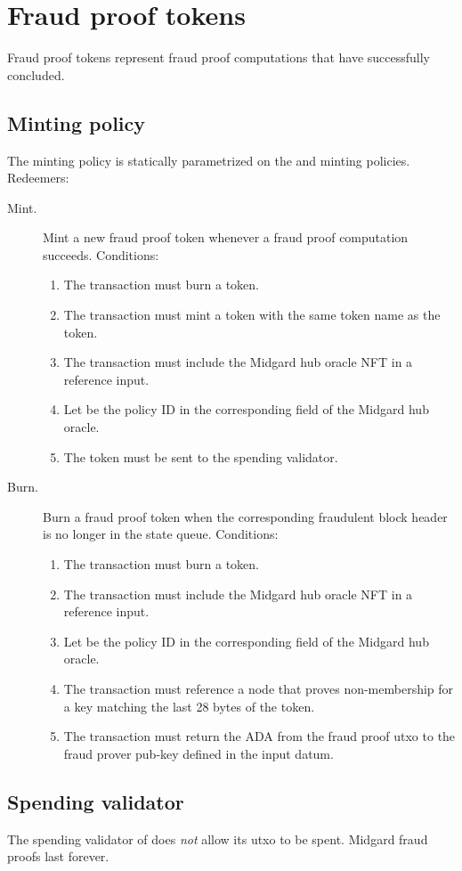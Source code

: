 \documentclass[../midgard.tex]{subfiles}
\begin{document}
\section{Fraud proof tokens}
\label{h:fraud-proof-tokens}

Fraud proof tokens represent fraud proof computations that have successfully concluded.

\subsection{Minting policy}
\label{h:fraud-proof-tokens-minting-policy}

The  minting policy is statically parametrized on the  and  minting policies.
Redeemers:

\begin{description}
    \item[Mint.] Mint a new fraud proof token whenever a fraud proof computation succeeds.
      Conditions:
        \begin{enumerate}
            \item The transaction must burn a  token.
            \item The transaction must mint a  token with the same token name as the  token.
            \item The transaction must include the Midgard hub oracle NFT in a reference input.
            \item Let  be the policy ID in the corresponding field of the Midgard hub oracle.
            \item The  token must be sent to the  spending validator.
        \end{enumerate}
    \item[Burn.] Burn a fraud proof token when the corresponding fraudulent block header is no longer in the state queue.
      Conditions:
        \begin{enumerate}
            \item The transaction must burn a  token.
            \item The transaction must include the Midgard hub oracle NFT in a reference input.
            \item Let  be the policy ID in the corresponding field of the Midgard hub oracle.
            \item The transaction must reference a  node that proves non-membership for a key matching the last 28 bytes of the  token.
            \item The transaction must return the ADA from the fraud proof utxo to the fraud prover pub-key defined in the input datum.
        \end{enumerate}
\end{description}

\subsection{Spending validator}
\label{h:fraud-proof-tokens-spending-validator}

The spending validator of  does \emph{not} allow its utxo to be spent.
Midgard fraud proofs last forever.
\end{document}
